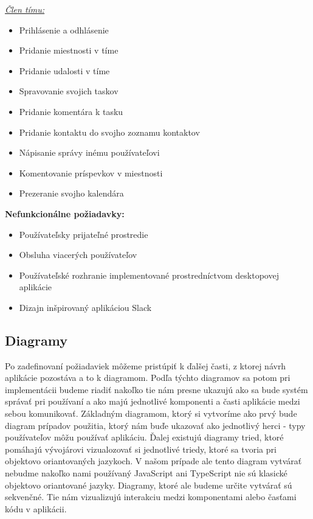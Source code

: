 \underline{\textit{Člen tímu:}}
\indent\begin{itemize}
    \item Prihlásenie a odhlásenie
    \item Pridanie miestnosti v tíme 
    \item Pridanie udalosti v tíme
    \item Spravovanie svojich taskov
    \item Pridanie komentára k tasku
    \item Pridanie kontaktu do svojho zoznamu kontaktov
    \item Nápisanie správy inému používateľovi
    \item Komentovanie príspevkov v miestnosti
    \item Prezeranie svojho kalendára\newline
\end{itemize}


\textbf{Nefunkcionálne požiadavky:}
\indent\begin{itemize}
    \item Používateľsky prijateľné prostredie
    \item Obsluha viacerých používateľov
    \item Používateľské rozhranie implementované prostredníctvom desktopovej aplikácie
    \item Dizajn inšpirovaný aplikáciou Slack
\end{itemize}

\subsection{Diagramy}
\indent Po zadefinovaní požiadaviek môžeme pristúpiť k ďalšej časti, z ktorej návrh aplikácie pozostáva a to k diagramom. Podľa týchto diagramov sa potom pri implementácii budeme riadiť nakoľko tie nám presne ukazujú ako sa bude systém správať pri používaní a ako majú jednotlivé komponenti a časti aplikácie medzi sebou komunikovať. Základným diagramom, ktorý si vytvoríme ako prvý bude diagram prípadov použitia, ktorý nám buďe ukazovať ako jednotlivý herci - typy používateľov môžu používať aplikáciu. Ďalej existujú diagramy tried, ktoré pomáhajú vývojárovi vizualozovať si jednotlivé triedy, ktoré sa tvoria pri objektovo oriantovaných jazykoch. V našom prípade ale tento diagram vytvárať nebudme nakoľko nami používaný JavaScript ani TypeScript nie sú klasické objektovo oriantované jazyky. Diagramy, ktoré ale budeme určite vytvárať sú sekvenčné. Tie nám vizualizujú interakciu medzi komponentami alebo časťami kódu v aplikácii.

